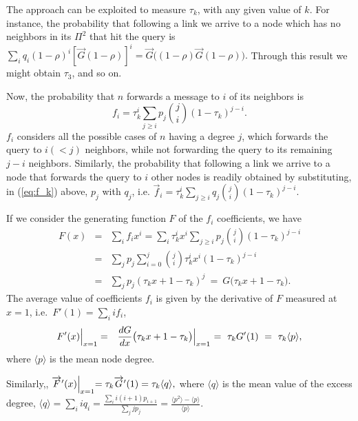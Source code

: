 \documentclass{sig-alternate}
\begin{document}
The approach can be exploited to measure $\tau_k$, with any given value of $k$. For instance, the probability that following a link we arrive to a node which has no neighbors in its $\Pi^2$ that hit the query is 
$\sum_i q_i (1-\rho)^i [\overrightarrow{G}(1-\rho)]^i = \overrightarrow{G}\big( (1-\rho){\overrightarrow{G}(1-\rho)} \big).$ 
Through this result we might obtain $\tau_3$, and so on.

Now, the probability that $n$ forwards a message to $i$ of its neighbors is
\begin{equation}\label{eq:f_k}
  f_i = \tau_k ^i \sum_{j \geq i} p_j \binom{j}{i} (1-\tau_k)^{j-i}.
\end{equation}
$f_i$ considers all the possible cases of $n$ having a degree $j$, which forwards the query to $i (<j)$ neighbors, while not forwarding the query to its remaining $j-i$ neighbors.
Similarly, the probability that following a link we arrive to a node that forwards the query to $i$ other nodes is readily obtained by substituting, in (\ref{eq:f_k}) above, $p_j$ with $q_j$, i.e.
$  \overrightarrow{f}_i = \tau_k^i \sum_{j \geq i} q_j \binom{j}{i} (1 - \tau_k)^{j-i}.$

If we consider the generating function $F$ of the $f_i$ coefficients, we have
\begin{eqnarray*}\label{eq:F_calcolo} 
  F(x) & = & \sum_i f_i x^i 
     =  \sum_i \tau_k^i x^i 
              \sum_{j \geq i} p_j \binom{j}{i} (1 - \tau_k)^{j-i}\nonumber \\
  & = & \sum_j p_j \sum_{i =0}^j \binom{j}{i}  \tau_k^i x^i (1 - \tau_k)^{j-i}\nonumber \\
   & = & \sum_j p_j (\tau_k x + 1 - \tau_k)^j \ =\  G\big(\tau_k x + 1 - \tau_k\big).
\end{eqnarray*}
The average value of coefficients $f_i$ is given by the derivative of $F$ measured at $x=1$, i.e.~$F'(1) = \sum_i i f_i$, \begin{eqnarray*}\label{eq:F'(1)} 
F'(x)\Bigl\lvert_{x=1} & = & \frac{dG}{dx}\big(\tau_k x + 1 - \tau_k\big)\Bigl\lvert_{x=1} 
 \ = \ \tau_k G'(1)\  =\  \tau_k \langle p \rangle,
\end{eqnarray*}
where $\langle p \rangle$ is the mean node degree.

Similarly,,
$  \overrightarrow{F}'(x)\Bigl\lvert_{x=1}
  = \tau_k \overrightarrow{G}'(1) = \tau_k \langle q \rangle,$
where $\langle q \rangle$ is the mean value of the excess degree,
$\langle q \rangle =  \sum_i i q_i = \frac{\sum_i i (i+1) p_{i+1}}{\sum_j j p_j}
   =  \frac{\langle p^2 \rangle - \langle p \rangle}{\langle p \rangle}.$
\end{document}
